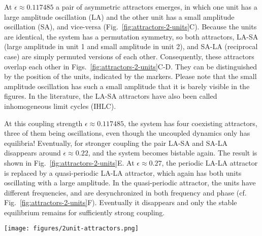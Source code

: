 At $\epsilon \approx 0.117485$ a pair of asymmetric attractors emerges, in which one unit has a large amplitude oscillation (LA) and the other unit has a small amplitude oscillation (SA), and vice-versa (Fig.~\ref{fig:attractors-2-units}C). Because the units are identical, the system has a permutation symmetry, so both attractors, LA-SA (large amplitude in unit 1 and small amplitude in unit 2), and SA-LA (reciprocal case) are simply permuted versions of each other. Consequently, these attractors overlap each other in Figs.~\ref{fig:attractors-2-units}C-D. They can be distinguished by the position of the units, indicated by the markers. Please note that the small amplitude oscillation has such a small amplitude that it is barely visible in the figures. In the literature, the LA-SA attractors have also been called inhomogeneous limit cycles \cite{ullner2008multistability, tyson1975control} (IHLC). %

At this coupling strength $\epsilon \approx 0.117485$, the system has four coexisting attractors, three of them being oscillations, even though the uncoupled dynamics only has equilibria! Eventually, for stronger coupling the pair LA-SA and SA-LA disappears around $\epsilon \approx 0.22$, and the system becomes bistable again. The result is shown in Fig.~\ref{fig:attractors-2-units}E. At $\epsilon \approx 0.27$, the periodic LA-LA attractor is replaced by a quasi-periodic LA-LA attractor, which again has both units oscillating with a large amplitude. In the quasi-periodic attractor, the units have different frequencies, and are desynchronized in both frequency and phase (cf. Fig.~\ref{fig:attractors-2-units}F). Eventually it disappears and only the stable equilibrium remains for sufficiently strong coupling. 
%
\begin{figure*}[ht!]
    \centering
    \texttt{[image: figures/2unit-attractors.png]}
    \caption{\textbf{Attractors created by the diffusive coupling for $N=2$.} Each panel is a projection onto $2D$ space of $x_i-y_i$ for different coupling strengths. The markers denote the positions of the units for an arbitrarily chosen time point, with unit 1 shown as a circle and unit 2 as a diamond. The stable equilibrium is the only attractor existing for weak coupling strengths, as shown for $\epsilon=0.05$. Another attractor emerges at $\epsilon \sim 0.065$ corresponding to two units oscillating with large amplitude - it is thus labelled as LA-LA. A pair of asymmetric attractors emerges at $\epsilon \sim 0.117485$ corresponding to one unit oscillating with large amplitude and the other oscillating with small amplitude; they are labeled respectively as LA-SA and SA-LA. The pair eventually disappears and the system becomes bistable again at $\epsilon=0.25$. At $\epsilon=0.3$, the LA-LA attractor is quasi-periodic. For stronger coupling $\epsilon$, only the stable equilibrium is left.}
    \label{fig:attractors-2-units}
\end{figure*}


